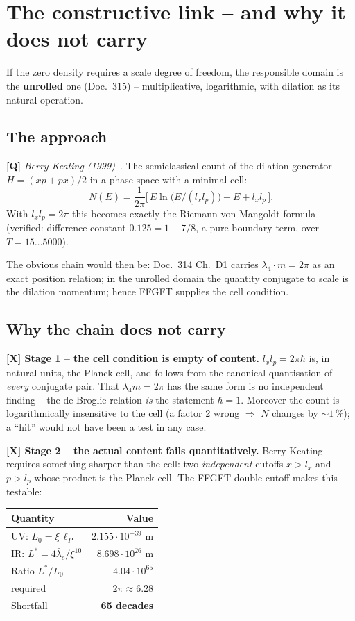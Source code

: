 \section{The constructive link -- and why it does not carry}
\label{sec:zelle}

If the zero density requires a scale degree of freedom, the responsible
domain is the \textbf{unrolled} one (Doc.~315) -- multiplicative,
logarithmic, with dilation as its natural operation.

\subsection{The approach}

\textbf{[Q]} \emph{Berry-Keating (1999)}~\cite{berry1999}. The semiclassical count of the
dilation generator $H = (xp+px)/2$ in a phase space with a minimal cell:
\[
  N(E) = \frac{1}{2\pi}\bigl[\,E\ln\bigl(E/(l_x l_p)\bigr)
  - E + l_x l_p\,\bigr].
\]
With $l_x l_p = 2\pi$ this becomes exactly the Riemann-von Mangoldt
formula (verified: difference constant $0.125 = 1 - 7/8$, a pure
boundary term, over $T = 15 \ldots 5000$).

The obvious chain would then be: Doc.~314 Ch.~D1 carries
$\lambda_4\cdot m = 2\pi$ as an exact position relation; in the unrolled
domain the quantity conjugate to scale is the dilation momentum; hence
FFGFT supplies the cell condition.

\subsection{Why the chain does not carry}

\textbf{[X] Stage 1 -- the cell condition is empty of content.}
$l_x l_p = 2\pi\hbar$ is, in natural units, the Planck cell, and follows
from the canonical quantisation of \emph{every} conjugate pair. That
$\lambda_4 m = 2\pi$ has the same form is no independent finding -- the
de Broglie relation \emph{is} the statement $\hbar = 1$. Moreover the
count is logarithmically insensitive to the cell (a factor 2 wrong
$\Rightarrow$ $N$ changes by ${\sim}1\,\%$); a \enquote{hit} would not
have been a test in any case.

\textbf{[X] Stage 2 -- the actual content fails quantitatively.}
Berry-Keating requires something sharper than the cell: two
\emph{independent} cutoffs $x > l_x$ and $p > l_p$ whose product is the
Planck cell. The FFGFT double cutoff makes this testable:

\begin{center}
\begin{tabular}{lr}
\toprule
Quantity & Value \\
\midrule
UV: $L_0 = \xi\,\ell_P$ & $2.155\cdot10^{-39}$ m \\
IR: $L^* = 4\bar\lambda_e/\xi^{10}$ & $8.698\cdot10^{26}$ m \\
Ratio $L^*/L_0$ & $4.04\cdot10^{65}$ \\
required & $2\pi \approx 6.28$ \\
\midrule
Shortfall & \textbf{65 decades} \\
\bottomrule
\end{tabular}
\end{center}

